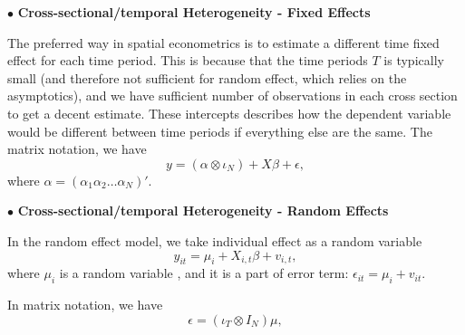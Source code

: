 \documentclass[11pt,a4paper]{amsart}
\theoremstyle{plain}
\theoremstyle{definition}
\begin{document}
$\bullet$ \textbf{Cross-sectional/temporal Heterogeneity - Fixed Effects}\hfill\par 
 The preferred way in spatial econometrics is to estimate a different time fixed effect for each time period. This is because that the time periods $T$ is typically small (and therefore not sufficient for random effect, which relies on the asymptotics), and we have sufficient number of observations in each cross section to get a decent estimate. These intercepts describes how the dependent variable would be different between time periods if everything else are the same. The matrix notation, we have 
 \[	y = (\alpha \otimes \iota_{N}) + X\beta + \epsilon,	\]
where $\alpha = (\alpha_{1} \alpha_{2} \dots \alpha_{N})'$.

$\bullet$ \textbf{Cross-sectional/temporal Heterogeneity - Random Effects}\hfill\par 
In the random effect model, we take individual effect as a random variable
\[	y_{it} = \mu_{i} + X_{i,t}\beta + v_{i,t},	\]
where $\mu_{i}$ is a random variable , and it is a part of error term: $\epsilon_{it} = \mu_{i} + v_{it}$.

In matrix notation, we have 
\[	\epsilon = (\iota_{T} \otimes I_{N})\mu,	\] 
\printbibliography %
		
\end{document}
